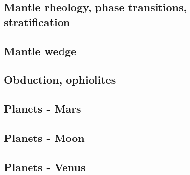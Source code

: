 \subsection*{Mantle rheology, phase transitions, stratification}

\noindent
\cite{yusb82}
\cite{zhyh92}
\cite{tasg93}
\cite{zhyu95}
\cite{pazw07}
\cite{java11}
\cite{tack12}

\subsection*{Mantle wedge}

\noindent
\cite{tosl78}
\cite{bigu01}
\cite{leki09}
\cite{roms10}
\cite{ledg14}

\subsection*{Obduction, ophiolites}

\noindent
\cite{hack90}
\cite{hack91}
\cite{agzf14}

\subsection*{Planets - Mars}

\cite{scbg90}
\cite{nist01}
\cite{vavv05}
\cite{seki14}
\cite{zhon16}

\subsection*{Planets - Moon}

\cite{zhdv19}

\subsection*{Planets - Venus}

\cite{scbg90}
\cite{kiha92}
\cite{somo96}
\cite{mazk98}\cite{moso98}
\cite{vavv05}
\cite{arta12}
\cite{cram17}\cite{dast17}
\cite{king18}



